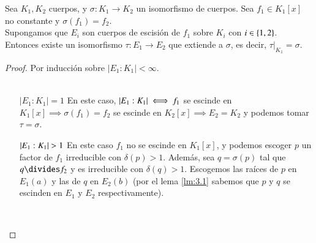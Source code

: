 \begin{thm}\label{thm:3.5}
    Sea $K_1, K_2$ cuerpos, y $\sigma: K_1 \to K_2$ un isomorfismo de cuerpos. Sea $f_1 \in K_1[x]$ no constante y $\sigma(f_1) = f_2$.\\ Supongamos que $E_i$ son cuerpos de escisión de $f_1$ sobre $K_i$ con $i \in \left\{1, 2\right\}$. Entonces existe un isomorfismo $\tau: E_1 \to E_2$ que extiende a $\sigma$, es decir, $\left. \tau \right|_{K_1} = \sigma$.
\end{thm}

\begin{proof}
    Por inducción sobre $|E_1:K_1| < \infty$.\\\\
    \begin{itemize}
        \item[$|E_1:K_1|=1$] En este caso, $\left|E_1:K_1\right| \iff f_1$ se escinde en $K_1[x] \implies \sigma(f_1) = f_2$ se escinde en $K_2[x] \implies E_2 = K_2$ y podemos tomar $\tau = \sigma$.
        \item[$\vabs{E_1:K_1}>1$] En este caso $f_1$ no se escinde en $K_1[x]$, y podemos escoger $p$ un factor de $f_1$ irreducible con $\delta(p) > 1$. Además, sea $q = \sigma(p)$ tal que $q \divides f_2$ y es irreducible con $\delta(q) > 1$.
        Escogemos las raíces de $p$ en $E_1(a)$ y las de $q$ en $E_2(b)$ (por el lema \ref{lm:3.1} sabemos que $p$ y $q$ se escinden en $E_1$ y $E_2$ respectivamente).
        \begin{center}
            \\

\end{center}
\end{itemize}
\end{proof}
